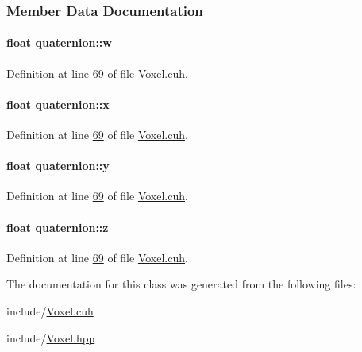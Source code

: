 \subsubsection{Member Data Documentation}
\paragraph[{\texorpdfstring{w}{w}}]{\setlength{\rightskip}{0pt plus 5cm}float quaternion\+::w}\hypertarget{classquaternion_ab2b38aca1971114e0ba4218b75d7f472}{}\label{classquaternion_ab2b38aca1971114e0ba4218b75d7f472}


Definition at line \hyperlink{Voxel_8cuh_source_l00069}{69} of file \hyperlink{Voxel_8cuh_source}{Voxel.\+cuh}.

\paragraph[{\texorpdfstring{x}{x}}]{\setlength{\rightskip}{0pt plus 5cm}float quaternion\+::x}\hypertarget{classquaternion_acdcda48f9dd7ff35873aae38fa33ab78}{}\label{classquaternion_acdcda48f9dd7ff35873aae38fa33ab78}


Definition at line \hyperlink{Voxel_8cuh_source_l00069}{69} of file \hyperlink{Voxel_8cuh_source}{Voxel.\+cuh}.

\paragraph[{\texorpdfstring{y}{y}}]{\setlength{\rightskip}{0pt plus 5cm}float quaternion\+::y}\hypertarget{classquaternion_a48e3d1fbf5e12eb54985c32b45dd8303}{}\label{classquaternion_a48e3d1fbf5e12eb54985c32b45dd8303}


Definition at line \hyperlink{Voxel_8cuh_source_l00069}{69} of file \hyperlink{Voxel_8cuh_source}{Voxel.\+cuh}.

\paragraph[{\texorpdfstring{z}{z}}]{\setlength{\rightskip}{0pt plus 5cm}float quaternion\+::z}\hypertarget{classquaternion_a538598007238d399f79ddcecd39ef5cf}{}\label{classquaternion_a538598007238d399f79ddcecd39ef5cf}


Definition at line \hyperlink{Voxel_8cuh_source_l00069}{69} of file \hyperlink{Voxel_8cuh_source}{Voxel.\+cuh}.



The documentation for this class was generated from the following files\+:\begin{DoxyCompactItemize}
\item 
include/\hyperlink{Voxel_8cuh}{Voxel.\+cuh}\item 
include/\hyperlink{Voxel_8hpp}{Voxel.\+hpp}\end{DoxyCompactItemize}
